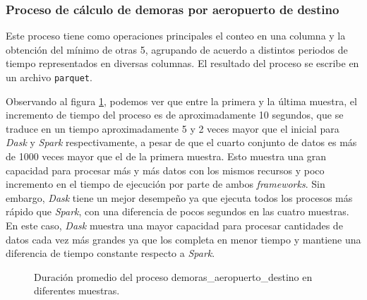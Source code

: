 \subsubsection{Proceso de cálculo de demoras por aeropuerto de destino}

Este proceso tiene como operaciones principales el conteo en una columna y la obtención del mínimo de otras 5, agrupando de acuerdo a distintos periodos de tiempo representados en diversas columnas. El resultado del proceso se escribe en un archivo \texttt{parquet}.

Observando al figura \ref{lineas:local-demoras-aeropuerto-destino}, podemos ver que entre la primera y la última muestra, el incremento de tiempo del proceso es de aproximadamente 10 segundos, que se traduce en un tiempo aproximadamente 5 y 2 veces mayor que el inicial para \textit{Dask} y \textit{Spark} respectivamente, a pesar de que el cuarto conjunto de datos es más de 1000 veces mayor que el de la primera muestra. Esto muestra una gran capacidad para procesar más y más datos con los mismos recursos y poco incremento en el tiempo de ejecución por parte de ambos \textit{frameworks}.  Sin embargo, \textit{Dask} tiene un mejor desempeño ya que ejecuta todos los procesos más rápido que \textit{Spark}, con una diferencia de pocos segundos en las cuatro muestras. En este caso, \textit{Dask} muestra una mayor capacidad para procesar cantidades de datos cada vez más grandes ya que los completa en menor tiempo y mantiene una diferencia de tiempo constante respecto a \textit{Spark}.

\begin{figure}
\centering
{}
\caption{Duración promedio del proceso demoras\_aeropuerto\_destino en diferentes muestras.}
\label{lineas:local-demoras-aeropuerto-destino}
\end{figure}

